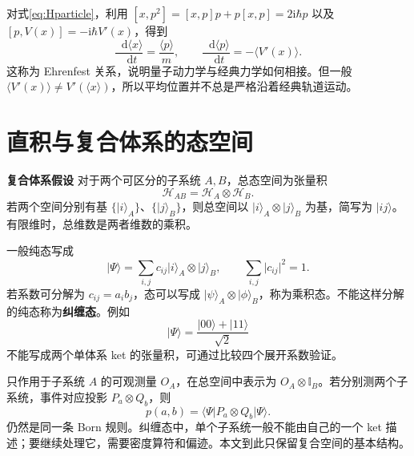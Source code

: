 \documentclass[a4paper,11pt]{article}
\numberwithin{equation}{section}
\newcommand{\ii}{\mathrm{i}}
\newcommand{\dd}{\mathop{}\!\mathrm{d}}
\newcommand{\HH}{\mathcal H}
\newcommand{\I}{\mathbb I}
\newcommand{\ket}[1]{\lvert #1\rangle}
\newcommand{\mel}[3]{\langle #1\rvert #2\lvert #3\rangle}
\newcommand{\avg}[1]{\langle #1\rangle}
\newcommand{\abs}[1]{\lvert #1\rvert}
\newcommand{\important}[1]{\par\noindent\textbf{#1}\quad}
\begin{document}
对式\eqref{eq:Hparticle}，利用 $[x,p^2]=[x,p]p+p[x,p]=2\ii\hbar p$ 以及 $[p,V(x)]=-\ii\hbar V'(x)$，得到
\begin{equation}
  \frac{\dd\avg{x}}{\dd t}=\frac{\avg{p}}{m},\qquad
  \frac{\dd\avg{p}}{\dd t}=-\avg{V'(x)}.
\end{equation}
这称为 Ehrenfest 关系，说明量子动力学与经典力学如何相接。但一般 $\avg{V'(x)}\neq V'(\avg{x})$，所以平均位置并不总是严格沿着经典轨道运动。

\section{直积与复合体系的态空间}
\important{复合体系假设}
对于两个可区分的子系统 $A,B$，总态空间为张量积
\begin{equation}
  \HH_{AB}=\HH_A\otimes\HH_B.
\end{equation}
若两个空间分别有基 $\{\ket{i}_A\}$、$\{\ket{j}_B\}$，则总空间以 $\ket{i}_A\otimes\ket{j}_B$ 为基，简写为 $\ket{ij}$。有限维时，总维数是两者维数的乘积。

一般纯态写成
\begin{equation}
  \ket{\Psi}=\sum_{i,j}c_{ij}\ket{i}_A\otimes\ket{j}_B,
  \qquad \sum_{i,j}\abs{c_{ij}}^2=1.
\end{equation}
若系数可分解为 $c_{ij}=a_i b_j$，态可以写成 $\ket{\psi}_A\otimes\ket{\phi}_B$，称为乘积态。不能这样分解的纯态称为\textbf{纠缠态}。例如
\begin{equation}
  \ket{\Psi}=\frac{\ket{00}+\ket{11}}{\sqrt2}
\end{equation}
不能写成两个单体系 ket 的张量积，可通过比较四个展开系数验证。

只作用于子系统 $A$ 的可观测量 $O_A$，在总空间中表示为 $O_A\otimes\I_B$。若分别测两个子系统，事件对应投影 $P_a\otimes Q_b$，则
\begin{equation}
  p(a,b)=\mel{\Psi}{P_a\otimes Q_b}{\Psi}.
\end{equation}
仍然是同一条 Born 规则。纠缠态中，单个子系统一般不能由自己的一个 ket 描述；要继续处理它，需要密度算符和偏迹。本文到此只保留复合空间的基本结构。
\end{document}
